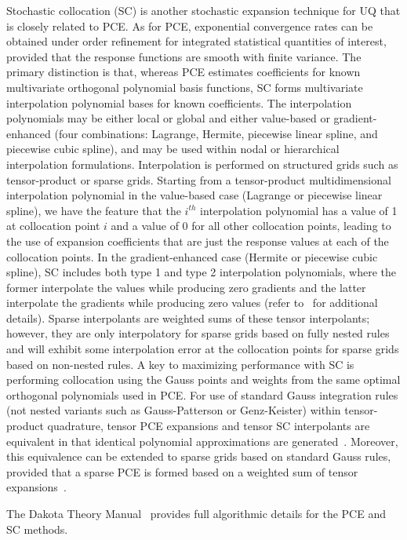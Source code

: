 Stochastic collocation (SC) is another stochastic expansion technique
for UQ that is closely related to PCE. As for PCE, exponential
convergence rates can be obtained under order refinement for
integrated statistical quantities of interest, provided that the
response functions are smooth with finite variance. The primary
distinction is that, whereas PCE estimates coefficients for known
multivariate orthogonal polynomial basis functions, SC forms
multivariate interpolation polynomial bases for known coefficients.
The interpolation polynomials may be either local or global and either
value-based or gradient-enhanced (four combinations: Lagrange,
Hermite, piecewise linear spline, and piecewise cubic spline), and may
be used within nodal or hierarchical interpolation
formulations. Interpolation is performed on structured grids such as
tensor-product or sparse grids. Starting from a tensor-product
multidimensional interpolation polynomial in the value-based case
(Lagrange or piecewise linear spline), we have the feature that the
$i^{th}$ interpolation polynomial has a value of 1 at collocation
point $i$ and a value of 0 for all other collocation points, leading
to the use of expansion coefficients that are just the response values
at each of the collocation points. In the gradient-enhanced case
(Hermite or piecewise cubic spline), SC includes both type 1 and type
2 interpolation polynomials, where the former interpolate the values
while producing zero gradients and the latter interpolate the
gradients while producing zero values (refer to~\cite{TheoMan} for
additional details). Sparse interpolants are weighted sums of these
tensor interpolants;
however, they are only interpolatory for sparse grids based on fully 
nested rules and will exhibit some interpolation error at the 
collocation points for sparse grids based on non-nested rules.
A key to maximizing performance with SC is performing collocation
using the Gauss points and weights from the same optimal orthogonal
polynomials used in PCE. 
For use of standard Gauss integration rules (not nested variants such
as Gauss-Patterson or Genz-Keister) within tensor-product quadrature,
tensor PCE expansions and tensor SC interpolants are equivalent in
that identical polynomial approximations are
generated~\cite{ConstTPQ}. Moreover, this equivalence can be extended
to sparse grids based on standard Gauss rules, provided that a sparse
PCE is formed based on a weighted sum of tensor expansions~\cite{ConstSSG}.

The Dakota Theory Manual~\cite{TheoMan} provides full algorithmic
details for the PCE and SC methods.



